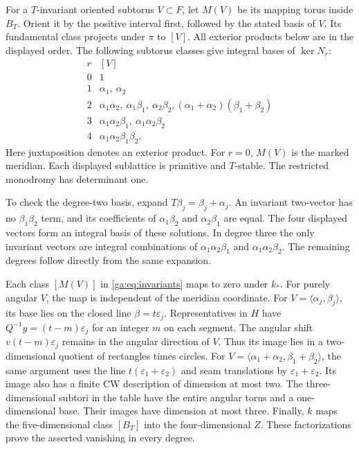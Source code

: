 For a $T$-invariant oriented subtorus $V\subset F$, let $M(V)$ be its
mapping torus inside $B_T$. Orient it by the positive interval first,
followed by the stated basis of $V$.
Its fundamental class projects under $\pi$ to $[V]$.
All exterior products below are in the displayed order.
The following subtorus classes give integral bases of $\ker N_r$:
\begin{equation}\label{ga:eq:invariants}
\begin{array}{c|l}
r&[V]\\\hline
0&1\\
1&\alpha_1,\ \alpha_2\\
2&\alpha_1\alpha_2,\ \alpha_1\beta_1,\ \alpha_2\beta_2,
 (\alpha_1+\alpha_2)(\beta_1+\beta_2)\\
3&\alpha_1\alpha_2\beta_1,\ \alpha_1\alpha_2\beta_2\\
4&\alpha_1\alpha_2\beta_1\beta_2.
\end{array}
\end{equation}
Here juxtaposition denotes an exterior product.
For $r=0$, $M(V)$ is the marked meridian.
Each displayed sublattice is primitive and $T$-stable.
The restricted monodromy has determinant one.

To check the degree-two basis, expand $T\beta_j=\beta_j+\alpha_j$.
An invariant two-vector has no $\beta_1\beta_2$ term, and its coefficients
of $\alpha_1\beta_2$ and $\alpha_2\beta_1$ are equal.
The four displayed vectors form an integral basis of these solutions.
In degree three the only invariant vectors are integral combinations of
$\alpha_1\alpha_2\beta_1$ and $\alpha_1\alpha_2\beta_2$.
The remaining degrees follow directly from the same expansion.

Each class $[M(V)]$ in \eqref{ga:eq:invariants} maps to zero under $k_*$.
For purely angular $V$, the map is independent of the meridian coordinate.
For $V=\langle\alpha_j,\beta_j\rangle$, its base lies on the closed
line $\beta=t\varepsilon_j$. Representatives in $H$ have
$Q^{-1}y=(t-m)\varepsilon_j$ for an integer $m$ on each segment.
The angular shift $v(t-m)\varepsilon_j$ remains in the angular direction of $V$.
Thus its image lies in a two-dimensional quotient of rectangles times circles.
For $V=\langle\alpha_1+\alpha_2,\beta_1+\beta_2\rangle$, the same
argument uses the line $t(\varepsilon_1+\varepsilon_2)$ and seam translations
by $\varepsilon_1+\varepsilon_2$.
Its image also has a finite CW description of dimension at most two.
The three-dimensional subtori in the table have the entire angular torus
and a one-dimensional base. Their images have dimension at most three.
Finally, $k$ maps the five-dimensional class $[B_T]$ into the four-dimensional $Z$.
These factorizations prove the asserted vanishing in every degree.


